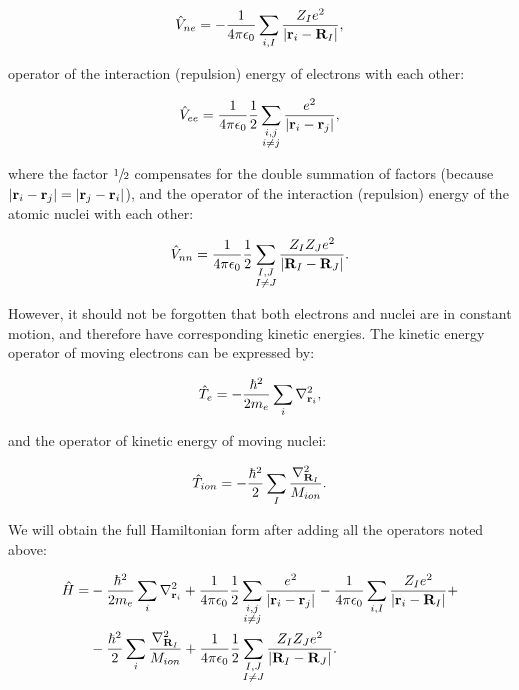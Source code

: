 \begin{equation}
    \label{Eq:Hamiltonian_n-e}
    \hat{V}_{ne}=-\frac{1}{4\pi\epsilon_0}\sum_{i,I}\frac{Z_Ie^2}{|\mathbf{r}_i-\mathbf{R}_I|},
\end{equation}

operator of the interaction (repulsion) energy of electrons with each other:

\begin{equation}
    \label{Eq:Hamiltonian_e-e}
    \hat{V}_{ee}=\frac{1}{4\pi\epsilon_0}\frac{1}{2}\sum_{\substack{i,j\\i\neq j}}\frac{e^2}{|\mathbf{r}_i-\mathbf{r}_j|},
\end{equation}

where the factor $\sfrac{1}{2}$ compensates for the double summation of factors (because $|\mathbf{r}_i-\mathbf{r}_j|=|\mathbf{r}_j-\mathbf{r}_i|$), and the operator of the interaction (repulsion) energy of the atomic nuclei with each other: 

\begin{equation}
    \label{Eq:Hamiltonian_n-n}
    \hat{V}_{nn}=\frac{1}{4\pi\epsilon_0}\frac{1}{2}\sum_{\substack{I,J\\I\neq J}}\frac{Z_IZ_Je^2}{|\mathbf{R}_I-\mathbf{R}_J|}.
\end{equation}

However, it should not be forgotten that both electrons and nuclei are in constant motion, and therefore have corresponding kinetic energies.
The kinetic energy operator of moving electrons can be expressed by: 

\begin{equation}
    \label{Eq:Hamiltonian_kin-e}
    \hat{T}_{e}=-\frac{\hbar^2}{2m_e}\sum_{i}\nabla^2_{\mathbf{r}_i},
\end{equation}

and the operator of kinetic energy of moving nuclei:

\begin{equation}
    \label{Eq:Hamiltonian_kin-n}
    \hat{T}_{ion}=-\frac{\hbar^2}{2}\sum_{I}\frac{\nabla^2_{\mathbf{R}_I}}{M_{ion}}.
\end{equation}

We will obtain the full Hamiltonian form after adding all the operators noted above: 

\begin{equation}
    \label{Eq:Hamiltonian_full_MB_no_hartreeunits}
    \begin{aligned}
        \hat{H}=
        &-\frac{\hbar^2}{2m_e}\sum_{i}\nabla^2_{\mathbf{r}_i}+\frac{1}{4\pi\epsilon_0}\frac{1}{2}\sum_{\substack{i,j\\i\neq j}}\frac{e^2}{|\mathbf{r}_i-\mathbf{r}_j|}-\frac{1}{4\pi\epsilon_0}\sum_{i,I}\frac{Z_Ie^2}{|\mathbf{r}_i-\mathbf{R}_I|}+\\
        &-\frac{\hbar^2}{2}\sum_{i}\frac{\nabla^2_{\mathbf{R}_I}}{M_{ion}}+\frac{1}{4\pi\epsilon_0}\frac{1}{2}\sum_{\substack{I,J\\I\neq J}}\frac{Z_IZ_Je^2}{|\mathbf{R}_I-\mathbf{R}_J|}.
    \end{aligned}
\end{equation}

